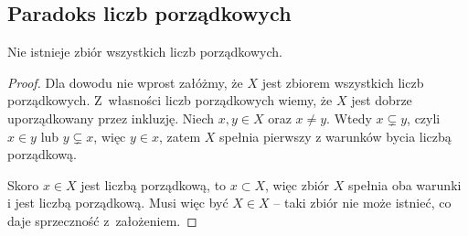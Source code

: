 \subsection{Paradoks liczb porządkowych}
\begin{theorem}
    Nie istnieje zbiór wszystkich liczb porządkowych.
\end{theorem}
\begin{proof}
    Dla dowodu nie wprost załóżmy, że \( X \) jest zbiorem wszystkich liczb porządkowych.
    Z~własności liczb porządkowych wiemy, że \( X \) jest dobrze uporządkowany przez inkluzję.
    Niech \( x, y \in X \) oraz \( x \neq y \). Wtedy \( x \subsetneq y \), czyli \( x \in y \) lub \( y \subsetneq x \), więc \( y \in x \), zatem \( X \) spełnia pierwszy z warunków bycia liczbą porządkową.

    Skoro \( x \in X \) jest liczbą porządkową, to \( x \subset X \), więc zbiór \( X \) spełnia oba warunki i jest liczbą porządkową. Musi więc być \( X \in X \) -- taki zbiór nie może istnieć, co daje sprzeczność z~założeniem.
\end{proof}